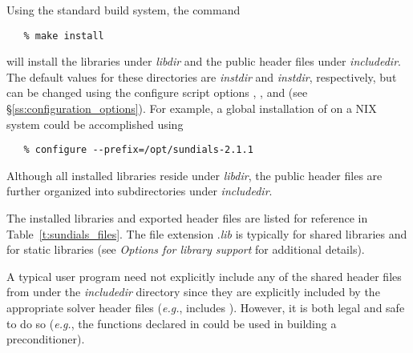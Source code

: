 Using the standard {\sundials} build system, the command
\begin{verbatim}
   % make install
\end{verbatim}
will install the libraries under {\em libdir} and the public header
files under {\em includedir}. The default values for these directories are
{\em instdir} and {\em instdir},
respectively, but can be changed using the configure script options
, ,  and  (see
\S\ref{ss:configuration_options}). For example, a global installation
of {\sundials} on a {\sc *NIX} system could be accomplished using
\begin{verbatim}
   % configure --prefix=/opt/sundials-2.1.1
\end{verbatim}
Although all installed libraries reside under {\em libdir}, the public header files
are further organized into subdirectories under {\em includedir}.

The installed libraries and exported header files are listed for
reference in Table~\ref{t:sundials_files}.  The file extension .{\em lib}
is typically  for shared libraries and  for static libraries
(see {\em Options for library support} for additional details).

A typical user program need not explicitly include any of the shared
{\sundials} header files from under the {\em includedir}
directory since they are explicitly included by the appropriate solver
header files ({\em e.g.},  includes
). However, it is both legal and safe to do so
({\em e.g.}, the functions declared in  
could be used in building a preconditioner).

